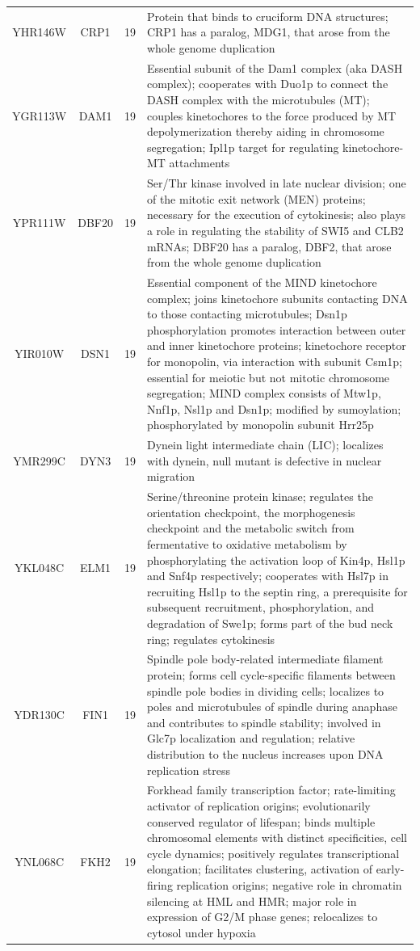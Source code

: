 \documentclass[]{article}
\begin{document}
\begin{longtable}{@{\extracolsep{3pt}} cccp{85mm}}
YHR146W & CRP1 & 19 & Protein that binds to cruciform DNA structures; CRP1 has a paralog, MDG1, that arose from the whole genome duplication \\ 
YGR113W & DAM1 & 19 & Essential subunit of the Dam1 complex (aka DASH complex); cooperates with Duo1p to connect the DASH complex with the microtubules (MT); couples kinetochores to the force produced by MT depolymerization thereby aiding in chromosome segregation; Ipl1p target for regulating kinetochore-MT attachments \\ 
YPR111W & DBF20 & 19 & Ser/Thr kinase involved in late nuclear division; one of the mitotic exit network (MEN) proteins; necessary for the execution of cytokinesis; also plays a role in regulating the stability of SWI5 and CLB2 mRNAs; DBF20 has a paralog, DBF2, that arose from the whole genome duplication \\ 
YIR010W & DSN1 & 19 & Essential component of the MIND kinetochore complex; joins kinetochore subunits contacting DNA to those contacting microtubules; Dsn1p phosphorylation promotes interaction between outer and inner kinetochore proteins; kinetochore receptor for monopolin, via interaction with subunit Csm1p; essential for meiotic but not mitotic chromosome segregation; MIND complex consists of Mtw1p, Nnf1p, Nsl1p and Dsn1p; modified by sumoylation; phosphorylated by monopolin subunit Hrr25p \\ 
YMR299C & DYN3 & 19 & Dynein light intermediate chain (LIC); localizes with dynein, null mutant is defective in nuclear migration \\ 
YKL048C & ELM1 & 19 & Serine/threonine protein kinase; regulates the orientation checkpoint, the morphogenesis checkpoint and the metabolic switch from fermentative to oxidative metabolism by phosphorylating the activation loop of Kin4p, Hsl1p and Snf4p respectively; cooperates with Hsl7p in recruiting Hsl1p to the septin ring, a prerequisite for subsequent recruitment, phosphorylation, and degradation of Swe1p; forms part of the bud neck ring; regulates cytokinesis \\ 
YDR130C & FIN1 & 19 & Spindle pole body-related intermediate filament protein; forms cell cycle-specific filaments between spindle pole bodies in dividing cells; localizes to poles and microtubules of spindle during anaphase and contributes to spindle stability; involved in Glc7p localization and regulation; relative distribution to the nucleus increases upon DNA replication stress \\ 
YNL068C & FKH2 & 19 & Forkhead family transcription factor; rate-limiting activator of replication origins; evolutionarily conserved regulator of lifespan; binds multiple chromosomal elements with distinct specificities, cell cycle dynamics; positively regulates transcriptional elongation; facilitates clustering, activation of early-firing replication origins; negative role in chromatin silencing at HML and HMR; major role in expression of G2/M phase genes; relocalizes to cytosol under hypoxia \\ 

\end{longtable}
\end{document}
